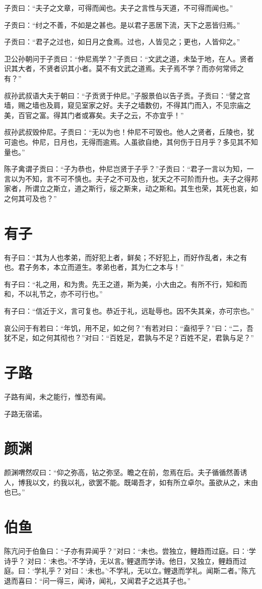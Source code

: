 \documentclass[a5paper]{ctexbook}
\begin{document}
    子贡曰：“夫子之文章，可得而闻也。夫子之言性与天道，不可得而闻也。”

    子贡曰：“纣之不善，不如是之甚也。是以君子恶居下流，天下之恶皆归焉。”
    
    子贡曰：“君子之过也，如日月之食焉。过也，人皆见之；更也，人皆仰之。”
    
    卫公孙朝问于子贡曰：“仲尼焉学？”子贡曰：“文武之道，未坠于地，在人。贤者识其大者，不贤者识其小者。莫不有文武之道焉。夫子焉不学？而亦何常师之有？”

    叔孙武叔语大夫于朝曰：“子贡贤于仲尼。”子服景伯以告子贡。子贡曰：“譬之宫墙，赐之墙也及肩，窥见室家之好。夫子之墙数仞，不得其门而入，不见宗庙之美，百官之富。得其门者或寡矣。夫子之云，不亦宜乎！”

    叔孙武叔毁仲尼。子贡曰：“无以为也！仲尼不可毁也。他人之贤者，丘陵也，犹可逾也。仲尼，日月也，无得而逾焉。人虽欲自绝，其何伤于日月乎？多见其不知量也。”

    陈子禽谓子贡曰：“子为恭也，仲尼岂贤于子乎？”子贡曰：“君子一言以为知，一言以为不知，言不可不慎也。夫子之不可及也，犹天之不可阶而升也。夫子之得邦家者，所谓立之斯立，道之斯行，绥之斯来，动之斯和。其生也荣，其死也哀，如之何其可及也？”

    \chapter{有子}

    有子曰：“其为人也孝弟，而好犯上者，鲜矣；不好犯上，而好作乱者，未之有也。君子务本，本立而道生。孝弟也者，其为仁之本与！”

    有子曰：“礼之用，和为贵。先王之道，斯为美，小大由之。有所不行，知和而和，不以礼节之，亦不可行也。”

    有子曰：“信近于义，言可复也。恭近于礼，远耻辱也。因不失其亲，亦可宗也。”

    哀公问于有若曰：“年饥，用不足，如之何？”有若对曰：“盍彻乎？”曰：“二，吾犹不足，如之何其彻也？”对曰：“百姓足，君孰与不足？百姓不足，君孰与足？”

    \chapter{子路}

    子路有闻，未之能行，惟恐有闻。

    子路无宿诺。

    \chapter{颜渊}

    颜渊喟然叹曰：“仰之弥高，钻之弥坚。瞻之在前，忽焉在后。夫子循循然善诱人，博我以文，约我以礼，欲罢不能。既竭吾才，如有所立卓尔。虽欲从之，末由也已。”

    \chapter{伯鱼}

    陈亢问于伯鱼曰：“子亦有异闻乎？”对曰：“未也。尝独立，鲤趋而过庭。曰：‘学诗乎？’对曰：‘未也。’‘不学诗，无以言。’鲤退而学诗。他日，又独立，鲤趋而过庭。曰：‘学礼乎？’对曰：‘未也。’‘不学礼，无以立。’鲤退而学礼。闻斯二者。”陈亢退而喜曰：“问一得三，闻诗，闻礼，又闻君子之远其子也。”
\end{document}
